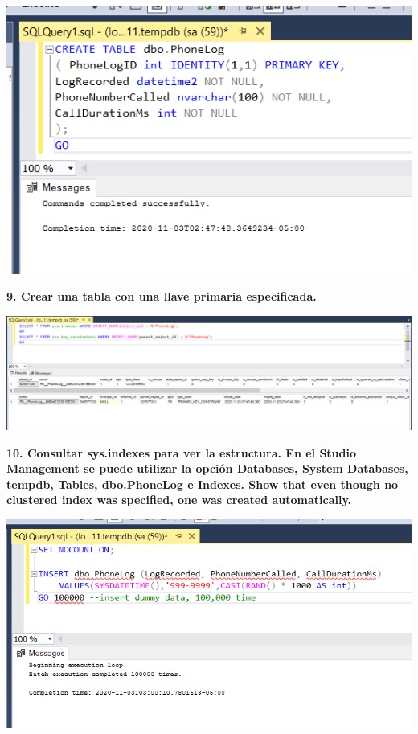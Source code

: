 \documentclass{article}
\begin{document}
    \begin{center}
		\includegraphics[width=15cm]{./images/12} 
	\end{center}

\textbf{9. Crear una tabla con una llave primaria especificada.}

    \begin{center}
		\includegraphics[width=15cm]{./images/13} 
	\end{center}

\newpage
\textbf{10. Consultar sys.indexes para ver la estructura. En el Studio Management se puede utilizar la opción Databases, System Databases, tempdb, Tables, dbo.PhoneLog e Indexes. Show that even though no clustered index was specified, one was created automatically.}

    \begin{center}
		\includegraphics[width=15cm]{./images/14} 
	\end{center}
\end{document}
